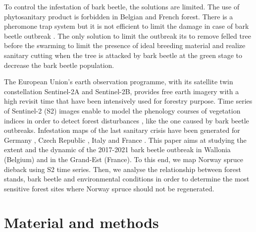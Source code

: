 \documentclass[3p,procedia]{elsarticle}
\begin{document}
To control the infestation of bark beetle, the solutions are limited. 
The use of phytosanitary product is forbidden in Belgian and French forest.
There is a pheromone trap system but it is not efficient to limit the damage in case of bark beetle outbreak \citep{kuhn_pheromone_2022}.
The only solution to limit the outbreak its to remove felled tree before the swarming to limit the presence of ideal breeding material and realize sanitary cutting when the tree is attacked by bark beetle at the green stage to decrease the bark beetle population. 

The European Union’s earth observation programme, with its satellite twin constellation Sentinel-2A and Sentinel-2B, provides free earth imagery with a high revisit time that have been intensively used for forestry purpose. 
Time series of Sentinel-2 (S2) images enable to model the phenology courses of vegetation indices in order to detect forest disturbances \citep{low_phenology_2020}, like the one caused by bark beetle outbreaks.
Infestation maps of the last sanitary crisis have been generated for Germany \citep{ali_canopy_2021,thonfeld_first_2022}, Czech Republic \citep{barta_early_2021}, Italy \citep{dalponte_mapping_2022} and France \citep{nardi_drought_2022}. 
This paper aims at studying the extent and the dynamic of the 2017-2021 bark beetle outbreak in Wallonia (Belgium) and in the Grand-Est (France).
To this end, we map Norway spruce dieback using S2 time series.
Then, we analyse the relationship between forest stands, bark beetle and environmental conditions in order to determine the most sensitive forest sites where Norway spruce should not be regenerated.


\section{Material and methods}
\end{document}
